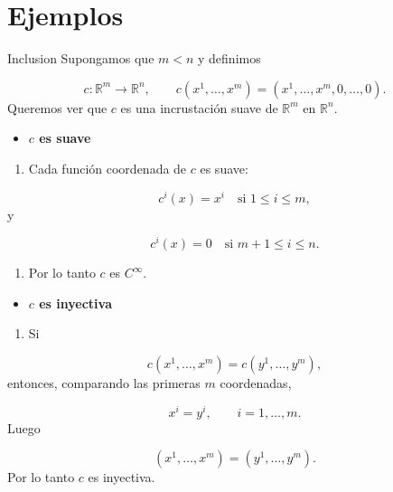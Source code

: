 \section{Ejemplos}
\begin{bookexample}{Inclusion}
Supongamos que $m<n$ y definimos

\[
c:\mathbb R^m\to\mathbb R^n,\qquad c(x^1,\dots,x^m)=(x^1,\dots,x^m,0,\dots,0).
\]
Queremos ver que $c$ es una incrustación suave de $\mathbb R^m$ en $\mathbb R^n$.

\end{bookexample}
\begin{bookproof}{}
\begin{itemize}
\item \textbf{$c$ es suave}
\end{itemize}
\begin{enumerate}
\item Cada función coordenada de $c$ es suave:
\end{enumerate}
\[
c^i(x)=x^i\quad\text{si }1\le i\le m,
\]
y

\[
c^i(x)=0\quad\text{si }m+1\le i\le n.
\]
\begin{enumerate}[start=2]
\item Por lo tanto $c$ es $C^\infty$.
\end{enumerate}
\begin{itemize}
\item \textbf{$c$ es inyectiva}
\end{itemize}
\begin{enumerate}
\item Si
\end{enumerate}
\[
c(x^1,\dots,x^m)=c(y^1,\dots,y^m),
\]
entonces, comparando las primeras $m$ coordenadas,

\[
x^i=y^i,\qquad i=1,\dots,m.
\]
Luego

\[
(x^1,\dots,x^m)=(y^1,\dots,y^m).
\]
Por lo tanto $c$ es inyectiva.


\end{bookproof}
